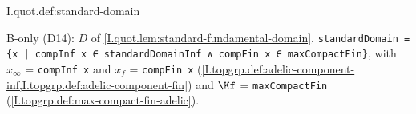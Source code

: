\begin{definition}
\bonly
{}
\end{definition}
\begin{tfformal}{I.quot.def:standard-domain}
\begin{tffidelity}
B-only (D14): $D$ of \cref{I.quot.lem:standard-fundamental-domain}. \texttt{standardDomain = \{x | compInf x ∈ standardDomainInf ∧ compFin x ∈ maxCompactFin\}}, with $x_\infty$ = \texttt{compInf x} and $x_f$ = \texttt{compFin x} (\cref{I.topgrp.def:adelic-component-inf,I.topgrp.def:adelic-component-fin}) and $\Kf$ = \texttt{maxCompactFin} (\cref{I.topgrp.def:max-compact-fin-adelic}).
\end{tffidelity}
\end{tfformal}

